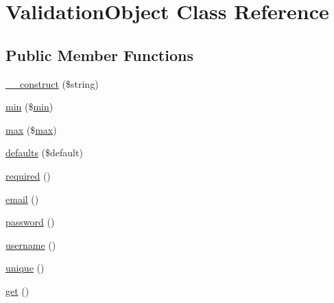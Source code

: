 \hypertarget{classcommon_1_1user_1_1legacy_1_1_validation_object}{\section{\-Validation\-Object \-Class \-Reference}
\label{classcommon_1_1user_1_1legacy_1_1_validation_object}
}
\subsection*{\-Public \-Member \-Functions}
\begin{DoxyCompactItemize}
\item 
\hyperlink{classcommon_1_1user_1_1legacy_1_1_validation_object_a86d355bfc3694145c81bf7ba65d3cded}{\-\_\-\-\_\-construct} (\$string)
\item 
\hyperlink{classcommon_1_1user_1_1legacy_1_1_validation_object_ab6a72cde0b8c9e14e033b23eaaddcfd5}{min} (\$\hyperlink{classcommon_1_1user_1_1legacy_1_1_validation_object_ab6a72cde0b8c9e14e033b23eaaddcfd5}{min})
\item 
\hyperlink{classcommon_1_1user_1_1legacy_1_1_validation_object_a19c1576ea97d24111f5323bd81ab280c}{max} (\$\hyperlink{classcommon_1_1user_1_1legacy_1_1_validation_object_a19c1576ea97d24111f5323bd81ab280c}{max})
\item 
\hyperlink{classcommon_1_1user_1_1legacy_1_1_validation_object_a1d459dff944c8c8a3e141a68d646a848}{defaults} (\$default)
\item 
\hyperlink{classcommon_1_1user_1_1legacy_1_1_validation_object_abd2999eed85fa7437ba20d06fc517623}{required} ()
\item 
\hyperlink{classcommon_1_1user_1_1legacy_1_1_validation_object_a0814d3be8538f244db1f0f63a9588a30}{email} ()
\item 
\hyperlink{classcommon_1_1user_1_1legacy_1_1_validation_object_af692b38313fcd34758e3269d74da796f}{password} ()
\item 
\hyperlink{classcommon_1_1user_1_1legacy_1_1_validation_object_a7475524fbb2e38dd6c9f7a6661b0bb81}{username} ()
\item 
\hyperlink{classcommon_1_1user_1_1legacy_1_1_validation_object_a4687cd60c977d2d7171628bc42c81129}{unique} ()
\item 
\hyperlink{classcommon_1_1user_1_1legacy_1_1_validation_object_ac33ee765f5ad9f134540bac393721cfe}{get} ()
\end{DoxyCompactItemize}
